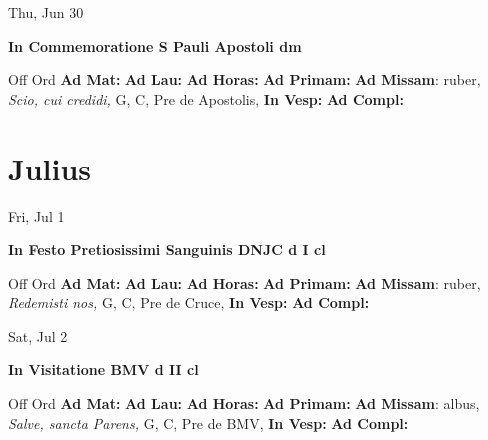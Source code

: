 \documentclass[10pt]{book}
\begin{document}
\begin{center}
\begin{minipage}{3.5in}
\vspace{2em}
\begin{center}Thu, Jun 30
\end{center}
\textbf{ \large In Commemoratione S Pauli Apostoli
\textnormal{\normalsize dm}}

\begin{justify}Off Ord
\textbf{Ad Mat: }
\textbf{Ad Lau: }
\textbf{Ad Horas: }
\textbf{Ad Primam: }\textbf{Ad Missam}: ruber, \textit{Scio, cui credidi,} G, C, Pre de Apostolis, 
\textbf{In Vesp: }
\textbf{Ad Compl: }
\end{justify}
\end{minipage}
\end{center}

    \chapter*{Julius}
                    
\begin{center}
\begin{minipage}{3.5in}
\vspace{2em}
\begin{center}Fri, Jul 1
\end{center}
\textbf{ \large In Festo Pretiosissimi Sanguinis DNJC
\textnormal{\normalsize d I cl}}

\begin{justify}Off Ord
\textbf{Ad Mat: }
\textbf{Ad Lau: }
\textbf{Ad Horas: }
\textbf{Ad Primam: }\textbf{Ad Missam}: ruber, \textit{Redemisti nos,} G, C, Pre de Cruce, 
\textbf{In Vesp: }
\textbf{Ad Compl: }
\end{justify}
\end{minipage}
\end{center}

\begin{center}
\begin{minipage}{3.5in}
\vspace{2em}
\begin{center}Sat, Jul 2
\end{center}
\textbf{ \large In Visitatione BMV
\textnormal{\normalsize d II cl}}

\begin{justify}Off Ord
\textbf{Ad Mat: }
\textbf{Ad Lau: }
\textbf{Ad Horas: }
\textbf{Ad Primam: }\textbf{Ad Missam}: albus, \textit{Salve, sancta Parens,} G, C, Pre de BMV, 
\textbf{In Vesp: }
\textbf{Ad Compl: }
\end{justify}
\end{minipage}
\end{center}
\end{document}
